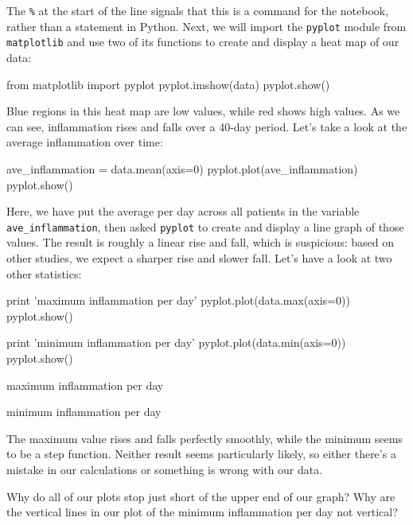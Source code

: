 \documentclass{book}
\begin{document}
The \texttt{\%} at the start of the line signals that this is a command
for the notebook, rather than a statement in Python. Next, we will
import the \texttt{pyplot} module from \texttt{matplotlib} and use two
of its functions to create and display a heat map of our data:

\begin{VerbIn}
from matplotlib import pyplot
pyplot.imshow(data)
pyplot.show()
\end{VerbIn}


Blue regions in this heat map are low values, while red shows high
values. As we can see, inflammation rises and falls over a 40-day
period. Let's take a look at the average inflammation over time:

\begin{VerbIn}
ave_inflammation = data.mean(axis=0)
pyplot.plot(ave_inflammation)
pyplot.show()
\end{VerbIn}


Here, we have put the average per day across all patients in the
variable \texttt{ave\_inflammation}, then asked \texttt{pyplot} to
create and display a line graph of those values. The result is roughly a
linear rise and fall, which is suspicious: based on other studies, we
expect a sharper rise and slower fall. Let's have a look at two other
statistics:

\begin{VerbIn}
print 'maximum inflammation per day'
pyplot.plot(data.max(axis=0))
pyplot.show()

print 'minimum inflammation per day'
pyplot.plot(data.min(axis=0))
pyplot.show()
\end{VerbIn}

\begin{VerbOut}
maximum inflammation per day

minimum inflammation per day

\end{VerbOut}

The maximum value rises and falls perfectly smoothly, while the minimum
seems to be a step function. Neither result seems particularly likely,
so either there's a mistake in our calculations or something is wrong
with our data.

\begin{challenge}
  Why do all of our plots stop just short of the upper end of our graph?
  Why are the vertical lines in our plot of the minimum inflammation per
  day not vertical?
\end{challenge}
\end{document}
